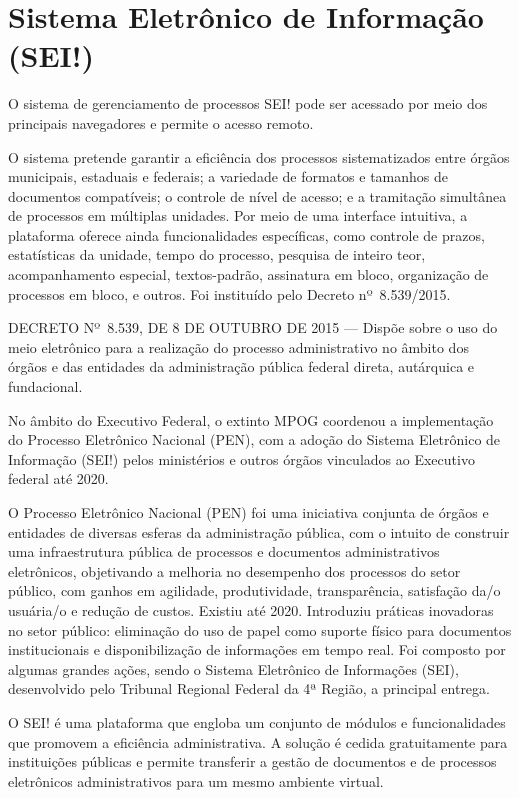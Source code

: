 \documentclass[openright, twoside, a4paper]{memoir}
\begin{document}
\section{Sistema Eletrônico de Informação
(SEI!)}

O sistema de gerenciamento de processos SEI! pode ser acessado por meio
dos principais navegadores e permite o acesso remoto.

O sistema pretende garantir a eficiência dos processos sistematizados
entre órgãos municipais, estaduais e federais; a variedade de formatos e
tamanhos de documentos compatíveis; o controle de nível de acesso; e a
tramitação simultânea de processos em múltiplas unidades. Por meio de
uma interface intuitiva, a plataforma oferece ainda funcionalidades
específicas, como controle de prazos, estatísticas da unidade, tempo do
processo, pesquisa de inteiro teor, acompanhamento especial,
textos-padrão, assinatura em bloco, organização de processos em bloco, e
outros. Foi instituído pelo Decreto nº~8.539/2015.

DECRETO Nº~8.539, DE 8 DE OUTUBRO DE 2015 --- Dispõe sobre o uso do meio
eletrônico para a realização do processo administrativo no âmbito dos
órgãos e das entidades da administração pública federal direta,
autárquica e fundacional.

No âmbito do Executivo Federal, o extinto MPOG coordenou a implementação
do Processo Eletrônico Nacional (PEN), com a adoção do Sistema
Eletrônico de Informação (SEI!) pelos ministérios e outros órgãos
vinculados ao Executivo federal até 2020.

O Processo Eletrônico Nacional (PEN) foi uma iniciativa conjunta de
órgãos e entidades de diversas esferas da administração pública, com o
intuito de construir uma infraestrutura pública de processos e
documentos administrativos eletrônicos, objetivando a melhoria no
desempenho dos processos do setor público, com ganhos em agilidade,
produtividade, transparência, satisfação da/o usuária/o e redução de
custos. Existiu até 2020. Introduziu práticas inovadoras no setor
público: eliminação do uso de papel como suporte físico para documentos
institucionais e disponibilização de informações em tempo real. Foi
composto por algumas grandes ações, sendo o Sistema Eletrônico de
Informações (SEI), desenvolvido pelo Tribunal Regional Federal da 4ª
Região, a principal entrega.

O SEI! é uma plataforma que engloba um conjunto de módulos e
funcionalidades que promovem a eficiência administrativa. A solução é
cedida gratuitamente para instituições públicas e permite transferir a
gestão de documentos e de processos eletrônicos administrativos para um
mesmo ambiente virtual.
\end{document}
